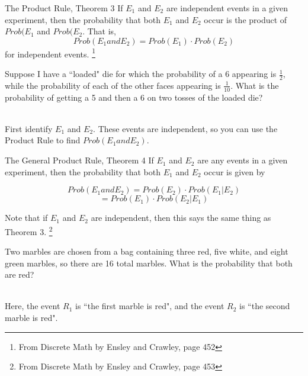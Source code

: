 {    \newpage

    \begin{intro}{The Product Rule, Theorem 3}
        If $E_{1}$ and $E_{2}$ are independent events in a given
        experiment, then the probability that both $E_{1}$ and $E_{2}$
        occur is the product of $Prob(E_{1}$ and $Prob(E_{2}$. That is,
        $$ Prob(E_{1} and E_{2}) = Prob(E_{1}) \cdot Prob(E_{2}) $$
        for independent events.
        \footnote{From Discrete Math by Ensley and Crawley, page 452}
    \end{intro}


    \begin{questionNOGRADE}{\thequestion}
        Suppose I have a ``loaded" die for which the probability of a 6
        appearing is $\frac{1}{2}$, while the probability of each of the other faces
        appearing is $\frac{1}{10}$. What is the probability of getting a 5
        and then a 6 on two tosses of the loaded die?

        ~\\
        First identify $E_{1}$ and $E_{2}$. These events are independent,
        so you can use the Product Rule to find $Prob(E_{1} and E_{2})$.
    \end{questionNOGRADE}

    \newpage

        \begin{intro}{The General Product Rule, Theorem 4}
            If $E_{1}$ and $E_{2}$ are any events in a given experiment, then
            the probability that both $E_{1}$ and $E_{2}$ occur is given by

            $$Prob(E_{1} and E_{2}) = Prob(E_{2}) \cdot Prob(E_{1} | E_{2}) $$
            $$ = Prob(E_{1}) \cdot Prob(E_{2} | E_{1}) $$

            Note that if $E_{1}$ and $E_{2}$ are independent, then this says
            the same thing as Theorem 3.
            \footnote{From Discrete Math by Ensley and Crawley, page 453}
        \end{intro}

    \begin{questionNOGRADE}{\thequestion}
        Two marbles are chosen from a bag containing three red, five white, and eight green marbles,
        so there are 16 total marbles.
        What is the probability that both are red?

        ~\\
        Here, the event $R_{1}$ is ``the first marble is red",
        and the event $R_{2}$ is ``the second marble is red".


\end{questionNOGRADE}}
